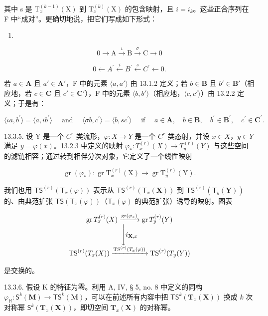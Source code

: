 其中 s 是 \(\mathrm{T}_{x}^{(k-1)}(\mathrm{X})\) 到 \(\mathrm{T}_{x}^{(k)}(\mathrm{X})\) 的包含映射，且 \(i=i_{k}\)。这些正合序列在 F 中“成对”。更确切地说，把它们写成如下形式：

\begin{enumerate}
\def\labelenumi{(\roman{enumi})}
\tightlist
\item
\end{enumerate}

\[
0 \rightarrow \mathrm{A} \xrightarrow {\iota} \mathrm{B} \xrightarrow {\sigma} \mathrm{C} \rightarrow 0\tag{ii}
\]

\[
0 \leftarrow A ^ {\prime} \stackrel {i} {\leftarrow} B ^ {\prime} \stackrel {s} {\leftarrow} C ^ {\prime} \leftarrow 0.
\]

若 \(a \in \mathbf{A}\) 且 \(a' \in \mathbf{A}'\)，F 中的元素 \(\langle a, a' \rangle\) 由 13.1.2 定义；若 \(b \in \mathbf{B}\) 且 \(b' \in \mathbf{B}'\)（相应地，若 \(c \in \mathbf{C}\) 且 \(c' \in \mathbf{C}'\)），F 中的元素 \(\langle b, b' \rangle\)（相应地，\(\langle c, c' \rangle\)）由 13.2.2 定义；于是有：

\[
\langle \iota a, b ^ {\prime} \rangle = \langle a, i b ^ {\prime} \rangle \quad \text { and } \quad \langle \sigma b, c ^ {\prime} \rangle = \langle b, s c ^ {\prime} \rangle \quad \text { if } \quad a \in \mathbf {A}, \quad b \in \mathbf {B}, \quad b ^ {\prime} \in \mathbf {B} ^ {\prime}, \quad c ^ {\prime} \in \mathbf {C} ^ {\prime}.
\]

13.3.5. 设 Y 是一个 \(C^{r}\) 类流形，\(\varphi: X \to Y\) 是一个 \(C^{r}\) 类态射，并设 \(x \in X\)，\(y \in Y\) 满足 \(y = \varphi(x)\)。13.2.3 中定义的映射 \(\varphi_{*}: T_{x}^{(r)}(X) \to T_{y}^{(r)}(Y)\) 与这些空间的滤链相容；通过转到相伴分次对象，它定义了一个线性映射

\[
\operatorname{gr} \left(\varphi_ {*}\right): \operatorname{gr} \mathrm{T} _ {x} ^ {(r)} (\mathrm{X}) \rightarrow \operatorname{gr} \mathrm{T} _ {y} ^ {(r)} (\mathrm{Y}).
\]

我们也用 \(\mathsf{TS}^{(r)}(\mathsf{T}_x(\varphi))\) 表示从 \(\mathsf{TS}^{(r)}(\mathsf{T}_x(\mathbf{X}))\) 到 \(\mathsf{TS}^{(r)}(\mathsf{T}_y(\mathbf{Y}))\) 的、由典范扩张 \(\mathsf{TS}(\mathsf{T}_x(\varphi))\)（\(\mathsf{T}_x(\varphi)\) 的典范扩张）诱导的映射。图表

\[
\begin{array}{c} \operatorname{gr} T _ {x} ^ {(r)} (X) \xrightarrow {\operatorname{gr} (\varphi_ {*})} \operatorname{gr} T _ {y} ^ {(r)} (Y) \\ \Biggl \downarrow i _ {\mathbf {X}, x} \\ \operatorname{TS} ^ {(r)} (T _ {x} (X)) \xrightarrow {\operatorname{TS} ^ {(r)} (T _ {x} (\varphi))} \operatorname{TS} ^ {(r)} (T _ {y} (Y)) \end{array}
\]

是交换的。

13.3.6. 假设 K 的特征为零。利用 A, IV, § 5, no. 8 中定义的同构 \(\varphi_{\mathbb{M}}: \mathsf{S}^k(\mathbf{M}) \to \mathsf{TS}^k(\mathbf{M})\)，可以在前述所有内容中把 \(\mathsf{TS}^k(\mathbf{T}_x(\mathbf{X}))\) 换成 \(k\) 次对称幂 \(\mathsf{S}^k(\mathbf{T}_x(\mathbf{X}))\)，即切空间 \(\mathbf{T}_x(\mathbf{X})\) 的对称幂。


